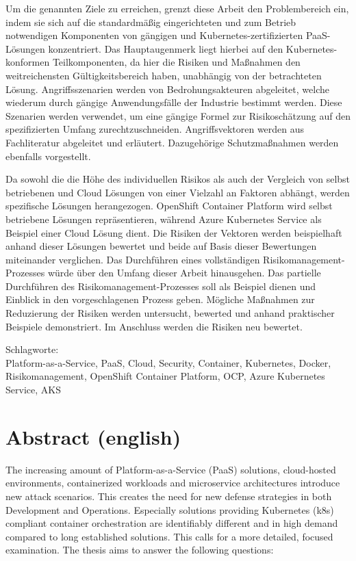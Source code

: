 Um die genannten Ziele zu erreichen, grenzt diese Arbeit den Problembereich ein, indem sie sich auf die standardmäßig eingerichteten und zum Betrieb notwendigen Komponenten von gängigen und Kubernetes-zertifizierten PaaS-Lösungen konzentriert.
Das Hauptaugenmerk liegt hierbei auf den Kubernetes-konformen Teilkomponenten, da hier die Risiken und Maßnahmen den weitreichensten Gültigkeitsbereich haben, unabhängig von der betrachteten Lösung.
Angriffsszenarien werden von Bedrohungsakteuren abgeleitet, welche wiederum durch gängige Anwendungsfälle der Industrie bestimmt werden.
Diese Szenarien werden verwendet, um eine gängige Formel zur Risikoschätzung auf den spezifizierten Umfang zurechtzuschneiden.
Angriffsvektoren werden aus Fachliteratur abgeleitet und erläutert. Dazugehörige Schutzmaßnahmen werden ebenfalls vorgestellt.

Da sowohl die die Höhe des individuellen Risikos als auch der Vergleich von selbst betriebenen und Cloud Lösungen von einer Vielzahl an Faktoren abhängt, werden spezifische Lösungen herangezogen. OpenShift Container Platform wird selbst betriebene Lösungen repräsentieren, während Azure Kubernetes Service als Beispiel einer Cloud Lösung dient.
Die Risiken der Vektoren werden beispielhaft anhand dieser Lösungen bewertet und beide auf Basis dieser Bewertungen miteinander verglichen.
Das Durchführen eines vollständigen Risikomanagement-Prozesses würde über den Umfang dieser Arbeit hinausgehen.
Das partielle Durchführen des Risikomanagement-Prozesses soll als Beispiel dienen und Einblick in den vorgeschlagenen Prozess geben.
Mögliche Maßnahmen zur Reduzierung der Risiken werden untersucht, bewerted und anhand praktischer Beispiele demonstriert.
Im Anschluss werden die Risiken neu bewertet.


\bigskip

\noindent
Schlagworte: \\
Platform-as-a-Service, PaaS, Cloud, Security, Container, Kubernetes, Docker, Risikomanagement, OpenShift Container Platform, OCP, Azure Kubernetes Service, AKS


\chapter*{Abstract (english)}
\thispagestyle{empty}

The increasing amount of Platform-as-a-Service (PaaS) solutions, cloud-hosted environments, containerized workloads and microservice architectures introduce new attack scenarios. 
This creates the need for new defense strategies in both Development and Operations. 
Especially solutions providing Kubernetes (k8s) compliant container orchestration are identifiably different and in high demand compared to long established solutions. 
This calls for a more detailed, focused examination. 
The thesis aims to answer the following questions:

